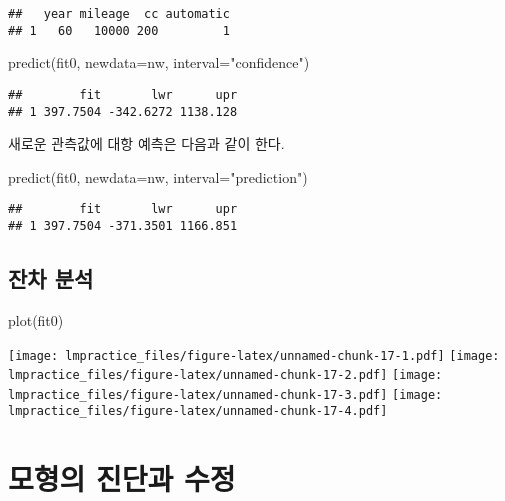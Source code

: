 \documentclass[
]{book}
\newenvironment{Shaded}{\begin{snugshade}}{\end{snugshade}}
\newcommand{\AttributeTok}[1]{\textcolor[rgb]{0.77,0.63,0.00}{#1}}
\newcommand{\FunctionTok}[1]{\textcolor[rgb]{0.00,0.00,0.00}{#1}}
\newcommand{\NormalTok}[1]{#1}
\newcommand{\StringTok}[1]{\textcolor[rgb]{0.31,0.60,0.02}{#1}}
\begin{document}
\begin{verbatim}
##   year mileage  cc automatic
## 1   60   10000 200         1
\end{verbatim}

\begin{Shaded}
\begin{Highlighting}[]
\FunctionTok{predict}\NormalTok{(fit0, }\AttributeTok{newdata=}\NormalTok{nw, }\AttributeTok{interval=}\StringTok{"confidence"}\NormalTok{)}
\end{Highlighting}
\end{Shaded}

\begin{verbatim}
##        fit       lwr      upr
## 1 397.7504 -342.6272 1138.128
\end{verbatim}

새로운 관측값에 대항 예측은 다음과 같이 한다.

\begin{Shaded}
\begin{Highlighting}[]
\FunctionTok{predict}\NormalTok{(fit0, }\AttributeTok{newdata=}\NormalTok{nw, }\AttributeTok{interval=}\StringTok{"prediction"}\NormalTok{)}
\end{Highlighting}
\end{Shaded}

\begin{verbatim}
##        fit       lwr      upr
## 1 397.7504 -371.3501 1166.851
\end{verbatim}

\hypertarget{uxc794uxcc28-uxbd84uxc11d}{%
\section{잔차 분석}\label{uxc794uxcc28-uxbd84uxc11d}}

\begin{Shaded}
\begin{Highlighting}[]
\FunctionTok{plot}\NormalTok{(fit0)}
\end{Highlighting}
\end{Shaded}

\texttt{[image: lmpractice\_files/figure-latex/unnamed-chunk-17-1.pdf]} \texttt{[image: lmpractice\_files/figure-latex/unnamed-chunk-17-2.pdf]} \texttt{[image: lmpractice\_files/figure-latex/unnamed-chunk-17-3.pdf]} \texttt{[image: lmpractice\_files/figure-latex/unnamed-chunk-17-4.pdf]}

\hypertarget{chapter04}{%
\chapter{모형의 진단과 수정}\label{chapter04}}
\end{document}
